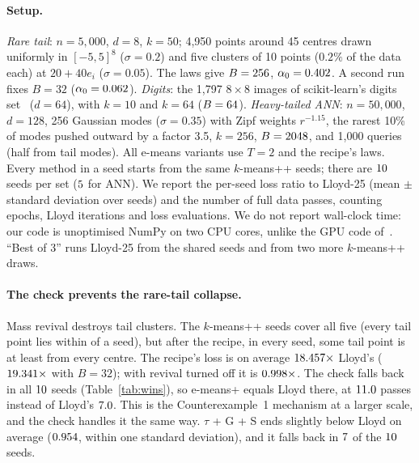 \documentclass[11pt]{article}
\theoremstyle{remark}
\begin{document}
\paragraph{Setup.} \emph{Rare tail}: $n=5{,}000$, $d=8$, $k=50$; 4{,}950 points around 45 centres
drawn uniformly in $[-5,5]^8$ ($\sigma=0.2$) and five clusters of 10 points ($0.2\%$ of the data
each) at $20+40e_i$ ($\sigma=0.05$). The laws give $B=256$, $\alpha_0=0.402$. A second run fixes
$B=32$ ($\alpha_0=0.062$). \emph{Digits}: the 1{,}797 $8\times8$ images of scikit-learn's
digits set~\cite{sklearn} ($d=64$), with $k=10$ and $k=64$ ($B=64$). \emph{Heavy-tailed ANN}: $n=50{,}000$,
$d=128$, 256 Gaussian modes ($\sigma=0.35$) with Zipf weights $r^{-1.15}$, the rarest 10\% of
modes pushed outward by a factor 3.5, $k=256$, $B=2048$, and 1{,}000 queries (half from tail
modes). All e-means variants use $T=2$ and the recipe's laws. Every method in a seed starts from
the same $k$-means++ seeds; there are $10$ seeds per set ($5$ for ANN). We report
the per-seed loss ratio to Lloyd-25 (mean $\pm$ standard deviation over seeds) and the number of
full data passes, counting epochs, Lloyd iterations and loss evaluations. We do not report
wall-clock time: our code is unoptimised NumPy on two CPU cores, unlike the GPU code
of~\cite{bessa2026}. ``Best of 3'' runs Lloyd-25 from the shared seeds and from two more
$k$-means++ draws.

\begin{table}[t]
\centering
\caption{Loss relative to Lloyd-25 from the same seeds (mean $\pm$ s.d.\ of the per-seed ratio; lower
is better) and full data passes. C: seed-loss check; S: polish to convergence, then C; G:
cost-guarded revival.}\label{tab:bench}
\resizebox{\textwidth}{!}{}
\end{table}

\begin{table}[t]
\centering
\small
\caption{Per-seed outcome against Lloyd-25: wins / losses (loss more than 0.1\% lower / higher) /
times the seed-loss check fell back to Lloyd.}\label{tab:wins}
\resizebox{\textwidth}{!}{}
\end{table}

\paragraph{The check prevents the rare-tail collapse.} Mass revival destroys tail clusters. The
$k$-means++ seeds cover all five (every tail point lies within \tailSeedMax{} of a seed), but after the
recipe, in every seed, some tail point is at least \tailMassMin{} from every centre. The recipe's
loss is on average $18.457\times$ Lloyd's ($19.341\times$ with $B=32$); with revival
turned off it is $0.998\times$. The check falls back in all $10$ seeds (Table~\ref{tab:wins}), so e-means+ equals
Lloyd there, at $11.0$ passes instead of Lloyd's $7.0$. This is the
Counterexample~1 mechanism at a larger scale, and the check handles it the same way. $\tau$ + G + S ends slightly below Lloyd on average ($0.954$, within one standard
deviation), and it falls back in $7$ of the $10$ seeds.
\end{document}
